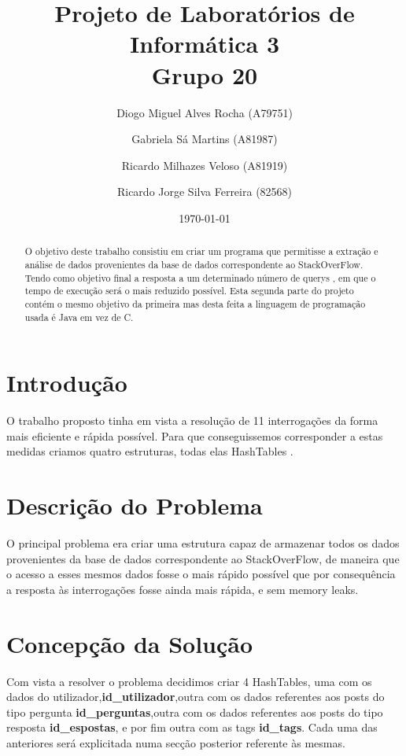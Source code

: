 \documentclass[a4paper]{article}
\title{Projeto de Laboratórios de Informática 3\\Grupo 20}
\author{Diogo Miguel Alves Rocha (A79751) \and Gabriela Sá Martins (A81987) \and Ricardo Milhazes Veloso (A81919) \and Ricardo Jorge Silva Ferreira (82568)}
\date{\today}
\begin{document}
\maketitle

\begin{abstract}

O objetivo deste trabalho consistiu em criar um programa que permitisse a extração e análise de dados provenientes da base de dados correspondente ao StackOverFlow. Tendo como objetivo final a resposta a um determinado número de querys , em que o tempo de execução será o mais reduzido possível.
Esta segunda parte do projeto contém o mesmo objetivo da primeira mas desta feita a linguagem de programação usada é Java em vez de C.

\end{abstract}

\tableofcontents

\section{Introdução}
\label{sec:intro}
O trabalho proposto tinha em vista a resolução de 11 interrogações da forma mais eficiente e rápida possível. Para que conseguissemos corresponder a estas medidas criamos quatro estruturas, todas elas HashTables .


\section{Descrição do Problema}

O principal problema era criar uma estrutura capaz de armazenar todos os dados provenientes da base de dados correspondente ao StackOverFlow, de maneira que o acesso a esses mesmos dados fosse o mais rápido possível que por consequência a resposta às interrogações fosse ainda mais rápida, e sem memory leaks.

\section{Concepção da Solução}

Com vista a resolver o problema decidimos criar 4 HashTables, uma com os dados do utilizador,\textbf{id_utilizador},outra com os dados referentes aos posts do tipo pergunta \textbf{id_perguntas},outra com os dados referentes aos posts do tipo resposta \textbf{id_espostas}, e por fim outra com as tags \textbf{id_tags}. Cada uma das anteriores será explicitada numa secção posterior referente às mesmas. 
\end{document}
